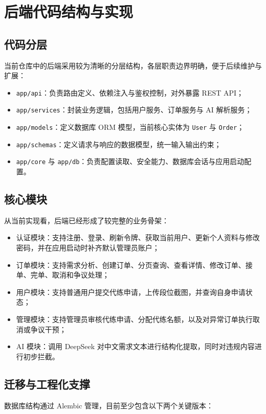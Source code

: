 ﻿\documentclass[12pt,a4paper]{ctexart}
\begin{document}
\section{后端代码结构与实现}

\subsection{代码分层}
当前仓库中的后端采用较为清晰的分层结构，各层职责边界明确，便于后续维护与扩展：

\begin{itemize}[leftmargin=2em]
  \item \texttt{app/api}：负责路由定义、依赖注入与鉴权控制，对外暴露 REST API；
  \item \texttt{app/services}：封装业务逻辑，包括用户服务、订单服务与 AI 解析服务；
  \item \texttt{app/models}：定义数据库 ORM 模型，当前核心实体为 \texttt{User} 与 \texttt{Order}；
  \item \texttt{app/schemas}：定义请求与响应的数据模型，统一输入输出约束；
  \item \texttt{app/core} 与 \texttt{app/db}：负责配置读取、安全能力、数据库会话与应用启动配置。
\end{itemize}

\subsection{核心模块}
从当前实现看，后端已经形成了较完整的业务骨架：

\begin{itemize}[leftmargin=2em]
  \item 认证模块：支持注册、登录、刷新令牌、获取当前用户、更新个人资料与修改密码，并在应用启动时补齐默认管理员账户；
  \item 订单模块：支持需求分析、创建订单、分页查询、查看详情、修改订单、接单、完单、取消和争议处理；
  \item 用户模块：支持普通用户提交代练申请，上传段位截图，并查询自身申请状态；
  \item 管理模块：支持管理员审核代练申请、分配代练名额，以及对异常订单执行取消或争议干预；
  \item AI 模块：调用 DeepSeek 对中文需求文本进行结构化提取，同时对违规内容进行初步拦截。
\end{itemize}

\subsection{迁移与工程化支撑}
数据库结构通过 Alembic 管理，目前至少包含以下两个关键版本：
\end{document}
